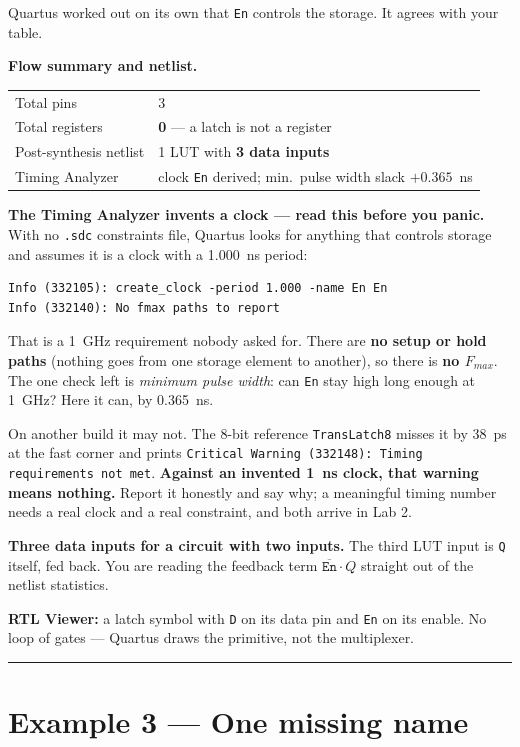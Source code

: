 \documentclass[11pt]{article}
\newcommand{\code}[1]{\texttt{#1}}
\newcommand{\hr}{\vspace{2pt}\hrule\vspace{6pt}}
\begin{document}
Quartus worked out on its own that \code{En} controls the storage. It agrees with
your table.

\textbf{Flow summary and netlist.}
\begin{center}
\begin{tabular}{ll}
\toprule
Total pins & 3 \\
Total registers & \textbf{0} \quad --- a latch is not a register \\
Post-synthesis netlist & 1 LUT with \textbf{3 data inputs} \\
Timing Analyzer & clock \code{En} derived; min.\ pulse width slack $+0.365$~ns \\
\bottomrule
\end{tabular}
\end{center}

\textbf{The Timing Analyzer invents a clock --- read this before you panic.} With no
\code{.sdc} constraints file, Quartus looks for anything that controls storage and
assumes it is a clock with a 1.000~ns period:
\begin{lstlisting}
Info (332105): create_clock -period 1.000 -name En En
Info (332140): No fmax paths to report
\end{lstlisting}
That is a 1~GHz requirement nobody asked for. There are \textbf{no setup or hold
paths} (nothing goes from one storage element to another), so there is \textbf{no
$F_{max}$}. The one check left is \emph{minimum pulse width}: can \code{En} stay high
long enough at 1~GHz? Here it can, by 0.365~ns.

On another build it may not. The 8-bit reference \code{TransLatch8} misses it by
38~ps at the fast corner and prints \code{Critical Warning (332148): Timing
requirements not met}. \textbf{Against an invented 1~ns clock, that warning means
nothing.} Report it honestly and say why; a meaningful timing number needs a real
clock and a real constraint, and both arrive in Lab 2.

\textbf{Three data inputs for a circuit with two inputs.} The third LUT input is
\code{Q} itself, fed back. You are reading the feedback term $\overline{\code{En}}\cdot Q$
straight out of the netlist statistics.

\textbf{RTL Viewer:} a latch symbol with \code{D} on its data pin and \code{En} on
its enable. No loop of gates --- Quartus draws the primitive, not the multiplexer.

\vspace{4pt}\hr

\section*{Example 3 --- One missing name}
\end{document}
